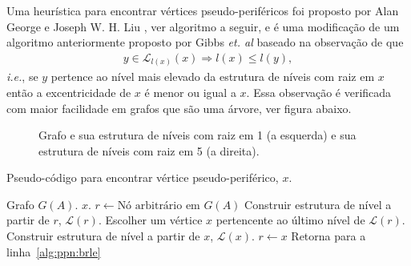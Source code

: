 Uma heurística para encontrar vértices pseudo-periféricos foi proposto por Alan
George e Joseph W. H. Liu \cite{George:1979:NodeFinder}, ver algoritmo a seguir, e
é uma modificação de um algoritmo anteriormente proposto por Gibbs \textit{et.
al} \cite{Gibbs:1976:ReducingBandwidth} baseado na observação de que
\begin{align*}
    y \in \mathcal{L}_{l(x)}(x) \Longrightarrow l(x) \leq l(y),
\end{align*}
\textit{i.e.}, se $y$ pertence ao nível mais elevado da estrutura de níveis com
raiz em $x$ então a excentricidade de $x$ é menor ou igual a $x$. Essa
observação é verificada com maior facilidade em grafos que são uma árvore, ver
figura abaixo.
\begin{figure}[!hbt]
    \centering
    \caption{Grafo e sua estrutura de níveis com raiz em 1 (a esquerda) e sua
    estrutura de níveis com raiz em 5 (a direita).}
    \label{fig:ilus_obser}
\end{figure}
\begin{algorithm}[H]
    \caption{Pseudo-código para encontrar vértice pseudo-periférico, $x$.}
    \label{alg:ppn}
    \begin{algorithmic}[1]
        \REQUIRE Grafo $G(A)$.
        \ENSURE $x$.
        \STATE $r \longleftarrow \text{Nó arbitrário em }G(A)$
        \STATE Construir estrutura de nível a partir de $r$, $\mathcal{L}(r)$.
        \label{alg:ppn:brle}
        \STATE Escolher um vértice $x$ pertencente ao último nível de
        $\mathcal{L}(r)$.
        \STATE Construir estrutura de nível a partir de $x$, $\mathcal{L}(x)$.
            \STATE $r \longleftarrow x$
            \STATE Retorna para a linha~\ref{alg:ppn:brle}
        \ENDIF
    \end{algorithmic}
\end{algorithm}
